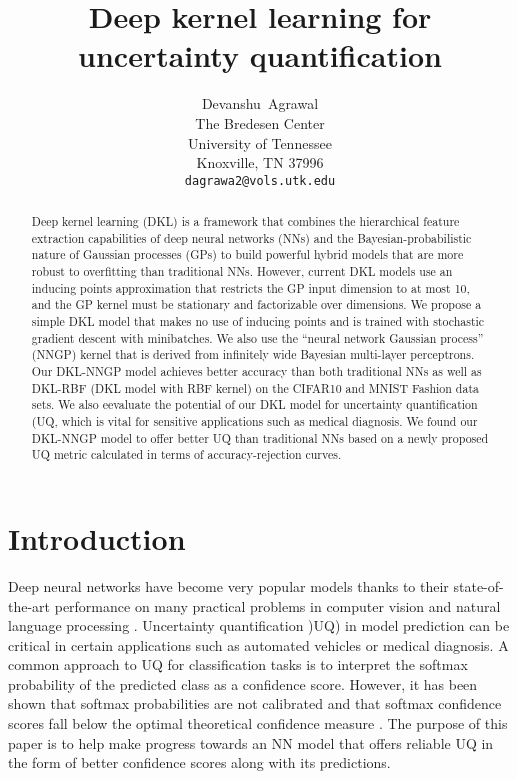 \documentclass{article}
\title{Deep kernel learning for uncertainty quantification}
\author{Devanshu~Agrawal\\
  The Bredesen Center\\
  University of Tennessee\\
  Knoxville, TN 37996\\
  \texttt{dagrawa2@vols.utk.edu} \\
}
\begin{document}

\maketitle

\begin{abstract}
Deep kernel learning (DKL) is a framework that combines the hierarchical feature extraction capabilities of deep neural networks (NNs) and the Bayesian-probabilistic nature of Gaussian processes (GPs) to build powerful hybrid models that are more robust to overfitting than traditional NNs. However, current DKL models use an inducing points approximation that restricts the GP input dimension to at most 10, and the GP kernel must be stationary and factorizable over dimensions. We propose a simple DKL model that makes no use of inducing points and is trained with stochastic gradient descent with minibatches. We also use the ``neural network Gaussian process'' (NNGP) kernel that is derived from infinitely wide Bayesian multi-layer perceptrons. Our DKL-NNGP model achieves better accuracy than both traditional NNs as well as DKL-RBF (DKL model with RBF kernel) on the CIFAR10 and MNIST Fashion data sets. We also eevaluate the potential of our DKL model for uncertainty quantification (UQ, which is vital for sensitive applications such as medical diagnosis. We found our DKL-NNGP model to offer better UQ than traditional NNs based on a newly proposed UQ metric calculated in terms of accuracy-rejection curves.
\end{abstract}

\section{Introduction}

Deep neural networks have become very popular models thanks to their state-of-the-art performance on many practical problems in computer vision and natural language processing \cite{krizhevsky2012imagenet, antipov2015learned, liang2017text}. Uncertainty quantification )UQ) in model prediction can be critical in certain applications such as automated vehicles or medical diagnosis. A common approach to UQ for classification tasks is to interpret the softmax probability of the predicted class as a confidence score. However, it has been shown that softmax probabilities are not calibrated and that softmax confidence scores fall below the optimal theoretical confidence measure \cite{guo2017calibration}. The purpose of this paper is to help make progress towards an NN model that offers reliable UQ in the form of better confidence scores along with its predictions.
\end{document}
